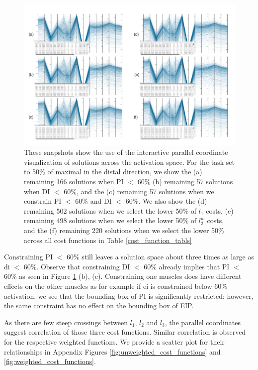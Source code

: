 \begin{figure}[htbp]
\centering
\includegraphics[width=\textwidth]{figs/parcoords.pdf}
\caption{These snapshots show the use of the interactive parallel coordinate visualization of solutions across the activation space. For the task set to 50\% of maximal in the distal direction, we show the
(a) remaining 166 solutions when PI $<$ 60\% 
(b) remaining 57 solutions when DI $<$ 60\%, and the
(c) remaining 57 solutions when we constrain PI $<$ 60\% and DI $<$ 60\%. We also show the
(d) remaining 502 solutions when we select the lower 50\% of $l_1$ costs,
(e) remaining 498 solutions when we select the lower 50\% of $l_2^w$ costs, and the
(f) remaining 220 solutions when we select the lower 50\% across all cost functions in Table \ref{cost_function_tabls} }
\label{fig:parcoords}
\end{figure}

Constraining PI $<$ 60\% still leaves a solution space about three times as large as di $<$ 60\%. 
Observe that constraining DI $<$ 60\% already implies that PI $<$ 60\% as seen in Figure \ref{fig:parcoords} (b), (c). 
Constraining one muscles does have different effects on the other muscles as for example if ei is constrained below 60\% activation, we see that the bounding box of PI is significantly restricted; however, the same constraint has no effect on the bounding box of EIP.

As there are few steep crossings between $l_1$, $l_2$ and $l_3$, the parallel coordinates suggest correlation of those three cost functions.
Similar correlation is observed for the respective weighted functions.
We provide a scatter plot for their relationships in Appendix Figures \ref{fig:unweighted_cost_functions} and \ref{fig:weighted_cost_functions}.

